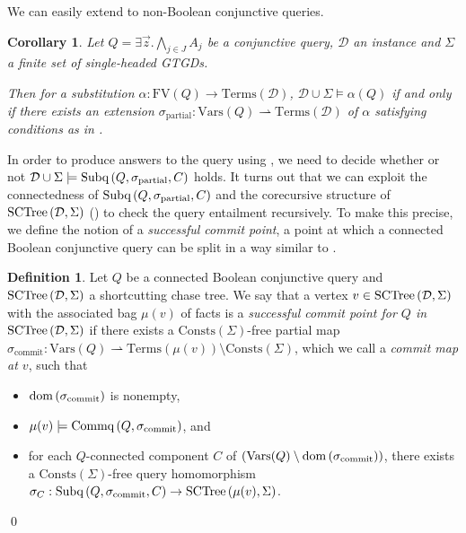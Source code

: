 \documentclass[12pt]{report}
\theoremstyle{plain}
\newtheorem{corollary}[theorem]{Corollary}
\theoremstyle{definition}
\newtheorem{definition}[theorem]{Definition}
\def\FV{{\mathrm{FV}}}
\def\Vars{{\mathrm{Vars}}}
\def\Consts{{\mathrm{Consts}}}
\def\Terms{{\mathrm{Terms}}}
\newcommand{\dom}[1]{\ensuremath{\normalfont{\operatorname{dom}} \left( #1 \right)}}
\newcommand{\SCTree}[2]{\ensuremath{\normalfont{\textrm{SCTree}} \left( #1, #2 \right)}}
\newcommand{\Subq}[3]{\ensuremath{\normalfont{\textrm{Subq}} \left( #1, #2, #3 \right)}}
\newcommand{\Commq}[2]{\ensuremath{\normalfont{\textrm{Commq}} \left( #1, #2 \right)}}
\begin{document}
We can easily extend  to non-Boolean conjunctive queries.

\begin{corollary}
\label{base-connected-query-decomposition}
  Let $Q = \exists \vec{z}. \bigwedge_{j \in J} A_j$ be a conjunctive query, $\mathcal{D}$ an instance and $\Sigma$ a finite set of single-headed GTGDs.
  
  Then for a substitution $\alpha: \FV(Q) \rightarrow \Terms(\mathcal{D})$, $\mathcal{D} \cup \Sigma \models \alpha(Q)$ if and only if there exists an extension $\sigma_\mathrm{partial}: \Vars(Q) \rightharpoonup \Terms(\mathcal{D})$ of $\alpha$ satisfying conditions as in .
\end{corollary}


In order to produce answers to the query using , we need to decide whether or not $\mathcal{D} \cup \Sigma \models \Subq{Q}{\sigma_\mathrm{partial}}{C}$ holds. It turns out that we can exploit the connectedness of $\Subq{Q}{\sigma_\mathrm{partial}}{C}$ and the corecursive structure of $\SCTree{\mathcal{D}}{\Sigma}$ () to check the query entailment recursively. To make this precise, we define the notion of a \emph{successful commit point}, a point at which a connected Boolean conjunctive query can be split in a way similar to .

\begin{definition}
\label{successful-commit-point-definition}
  Let $Q$ be a connected Boolean conjunctive query and $\SCTree{\mathcal{D}}{\Sigma}$ a shortcutting chase tree. We say that a vertex $v \in \SCTree{\mathcal{D}}{\Sigma}$ with the associated bag $\mu(v)$ of facts is a \emph{successful commit point for $Q$ in $\SCTree{\mathcal{D}}{\Sigma}$} if there exists a $\Consts(\Sigma)$-free partial map $\sigma_\mathrm{commit}: \Vars(Q) \rightharpoonup \Terms(\mu(v)) \setminus \Consts(\Sigma)$, which we call a \emph{commit map at $v$}, such that
  \begin{itemize}
    \item $\dom{\sigma_\mathrm{commit}}$ is nonempty,
    \item $\mu(v) \models \Commq{Q}{\sigma_\mathrm{commit}}$, and
    \item for each $Q$-connected component $C$ of $(\Vars(Q) \setminus \dom{\sigma_\mathrm{commit}})$, there exists a $\Consts(\Sigma)$-free query homomorphism $\sigma_C: \Subq{Q}{\sigma_\mathrm{commit}}{C} \rightarrow \SCTree{\mu(v)}{\Sigma}$.
  \end{itemize}
  \qed
\end{definition}
\end{document}
